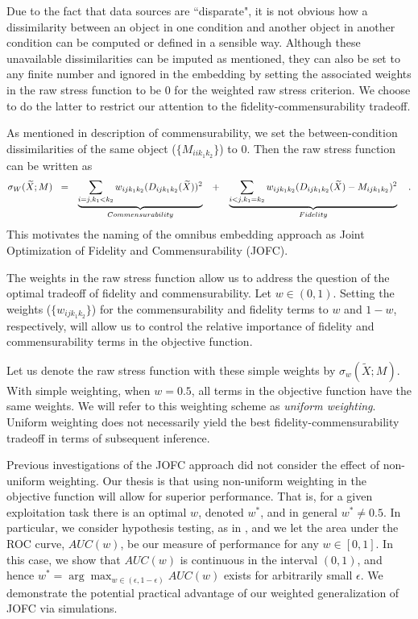 \documentclass[12pt]{article} %
\begin{document}
   Due to the fact that data sources are ``disparate", it is not obvious how  a dissimilarity between an object in one condition and another object in another condition  can be computed or  defined in a sensible way. Although these unavailable dissimilarities can be imputed as mentioned,  they can  also be set to any finite number and ignored in the embedding by setting the associated weights in the raw stress function to be 0 for the weighted raw stress criterion. We choose to do the latter to  restrict our attention to  the fidelity-commensurability tradeoff. 

 As mentioned in description of commensurability, we set the between-condition dissimilarities of the same object ($\{M_{iik_1k_2}\}$) to $0$. Then the raw stress function can be written as
\begin{align}
\sigma_W(\widetilde{X};M)\hspace{3pt}   
\hspace{3pt}&=&\underbrace{\sum_{i=j,k_1< k_2}  {w_{ij{k_1}{k_2}}(D_{ij{k_1}{k_2}}(\widetilde{X}))^2}}_{Commensurability}  \hspace{10pt}  &  +&\underbrace{\sum_{i< j,k_1=k_2}  {w_{ij{k_1}{k_2}}(D_{ij{k_1}{k_2}}(\widetilde{X})-M_{ijk_1k_2})^2  }  } _{Fidelity}\notag\label{eq:FidCommSep_final}\hspace{10pt}.
\end{align}
This motivates  the naming of the   omnibus embedding approach as Joint Optimization of Fidelity and Commensurability (JOFC).



 The weights in the raw stress function allow us to address the question of the optimal tradeoff of  fidelity and commensurability. Let $w \in (0,1)$. Setting the weights ($\{w_{ijk_1k_2}\}$)  for the commensurability  and fidelity  terms    to $w$ and $1-w$, respectively,  will allow us to control the relative importance of fidelity and commensurability terms in the objective function.

 Let us denote the raw stress function with these simple weights by $\sigma_w(\widetilde{X};M)$. With simple weighting, when $w=0.5$, all terms in the objective function have the same weights. We will refer to this weighting scheme as \emph{uniform weighting}. Uniform weighting does not necessarily yield the best fidelity-commensurability tradeoff in terms of subsequent inference. 

 Previous investigations of the JOFC approach \cite{JOFC} did not consider the effect of non-uniform weighting.
Our thesis is that using non-uniform weighting  in the objective function will allow for superior performance.
That is, for a given exploitation task there is an optimal $w$, denoted $w^*$, and in general $w^* \neq 0.5$.
In particular, we consider hypothesis testing, as in \cite{JOFC},
and we let the area under the ROC curve, $AUC(w)$, be our measure of performance for any $w \in [0,1]$.
In this case, we show that $AUC(w)$ is continuous in the interval $(0,1)$, and hence $w^* = \arg\max_{w \in (\epsilon,1-\epsilon)} AUC(w)$ exists for arbitrarily small $\epsilon$.
We demonstrate the potential practical advantage of our weighted generalization of JOFC via simulations.
\end{document}
